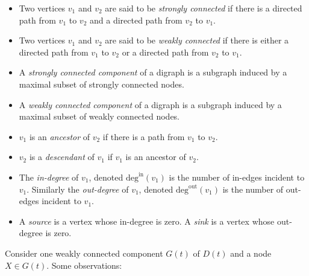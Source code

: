 \documentclass{article}
\numberwithin{equation}{section}
\begin{document}
\begin{itemize}
  \item Two vertices $v_1$ and $v_2$ are said to be \textit{strongly
  connected} if there is a directed path from $v_1$ to $v_2$ and a directed
  path from $v_2$ to $v_1$.
  \item Two vertices $v_1$ and $v_2$ are said to be \textit{weakly connected}
  if there is either a directed path from $v_1$ to $v_2$ or a directed path
  from $v_2$ to $v_1$.
  \item A \textit{strongly connected component} of a digraph is a subgraph
  induced by a maximal subset of strongly connected nodes.
  \item A \textit{weakly connected component} of a digraph is a subgraph
  induced by a maximal subset of weakly connected nodes.
  \item $v_1$ is an \textit{ancestor} of $v_2$ if there is a path from $v_1$
  to $v_2$.
  \item $v_2$ is a \textit{descendant} of $v_1$ if $v_1$ is an ancestor of
  $v_2$.
  \item The \textit{in-degree} of $v_1$, denoted $\text{deg}^{\text{in}}(v_1)$
  is the number of in-edges incident to $v_1$.
  Similarly the \textit{out-degree} of $v_1$, denoted
  $\text{deg}^{\text{out}}(v_1)$ is the number of out-edges incident to $v_1$.
  \item A \textit{source} is a vertex whose in-degree is zero.
  A \textit{sink} is a vertex whose out-degree is zero.
\end{itemize}


Consider one weakly connected component $G(t)$ of $D(t)$ and a node
$X \in G(t)$. Some observations:
\end{document}
